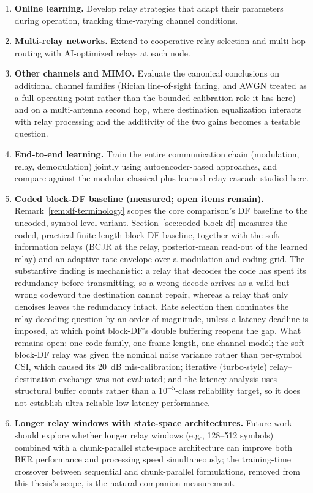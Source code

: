 \begin{enumerate}
\item
  \textbf{Online learning.} Develop relay strategies that adapt their parameters during operation, tracking time-varying channel conditions.
\item
  \textbf{Multi-relay networks.} Extend to cooperative relay selection and multi-hop routing with AI-optimized relays at each node.
\item
  \textbf{Other channels and MIMO.} Evaluate the canonical conclusions on additional channel families (Rician line-of-sight fading, and AWGN treated as a full operating point rather than the bounded calibration role it has here) and on a multi-antenna second hop, where destination equalization interacts with relay processing and the additivity of the two gains becomes a testable question.
\item
  \textbf{End-to-end learning.} Train the entire communication chain (modulation, relay, demodulation) jointly using autoencoder-based approaches, and compare against the modular classical-plus-learned-relay cascade studied here.
\item
  \textbf{Coded block-DF baseline (measured; open items remain).} Remark~\ref{rem:df-terminology} scopes the core comparison's DF baseline to the uncoded, symbol-level variant. Section~\ref{sec:coded-block-df} measures the coded, practical finite-length block-DF baseline, together with the soft-information relays (BCJR at the relay, posterior-mean read-out of the learned relay) and an adaptive-rate envelope over a modulation-and-coding grid. The substantive finding is mechanistic: a relay that decodes the code has spent its redundancy before transmitting, so a wrong decode arrives as a valid-but-wrong codeword the destination cannot repair, whereas a relay that only denoises leaves the redundancy intact. Rate selection then dominates the relay-decoding question by an order of magnitude, unless a latency deadline is imposed, at which point block-DF's double buffering reopens the gap. What remains open: one code family, one frame length, one channel model; the soft block-DF relay was given the nominal noise variance rather than per-symbol CSI, which caused its 20~dB mis-calibration; iterative (turbo-style) relay--destination exchange was not evaluated; and the latency analysis uses structural buffer counts rather than a $10^{-5}$-class reliability target, so it does not establish ultra-reliable low-latency performance.
\item
  \textbf{Longer relay windows with state-space architectures.} Future work should explore whether longer relay windows (e.g., 128--512 symbols) combined with a chunk-parallel state-space architecture can improve both BER performance and processing speed simultaneously; the training-time crossover between sequential and chunk-parallel formulations, removed from this thesis's scope, is the natural companion measurement.
\end{enumerate}

